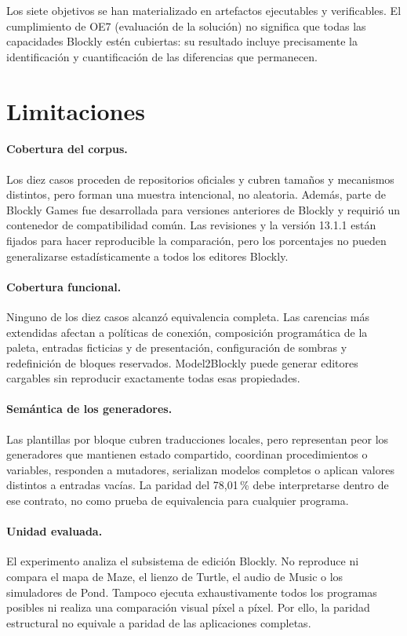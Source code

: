 Los siete objetivos se han materializado en artefactos ejecutables y
verificables. El cumplimiento de OE7 (evaluación de la solución) no significa que todas las capacidades
Blockly estén cubiertas: su resultado incluye precisamente la identificación y
cuantificación de las diferencias que permanecen.

\section{Limitaciones}
\label{sec:conclusiones-limitaciones}

\paragraph{Cobertura del corpus.}
Los diez casos proceden de repositorios oficiales y cubren tamaños y mecanismos
distintos, pero forman una muestra intencional, no aleatoria. Además, parte de
Blockly Games fue desarrollada para versiones anteriores de Blockly y requirió
un contenedor de compatibilidad común. Las revisiones y la versión 13.1.1 están
fijados para hacer reproducible la comparación, pero los porcentajes no pueden
generalizarse estadísticamente a todos los editores Blockly.

\paragraph{Cobertura funcional.}
Ninguno de los diez casos alcanzó equivalencia completa. Las carencias más
extendidas afectan a políticas de conexión, composición programática de la
paleta, entradas ficticias y de presentación, configuración de sombras y
redefinición de bloques reservados. Model2Blockly puede generar editores
cargables sin reproducir exactamente todas esas propiedades.

\paragraph{Semántica de los generadores.}
Las plantillas por bloque cubren traducciones locales, pero representan peor los
generadores que mantienen estado compartido, coordinan procedimientos o
variables, responden a mutadores, serializan modelos completos o aplican valores
distintos a entradas vacías. La paridad del 78,01\,\% debe interpretarse dentro
de ese contrato, no como prueba de equivalencia para cualquier programa.

\paragraph{Unidad evaluada.}
El experimento analiza el subsistema de edición Blockly. No reproduce ni compara
el mapa de Maze, el lienzo de Turtle, el audio de Music o los simuladores de
Pond. Tampoco ejecuta exhaustivamente todos los programas posibles ni realiza
una comparación visual píxel a píxel. Por ello, la paridad estructural no
equivale a paridad de las aplicaciones completas.

